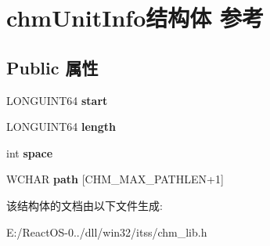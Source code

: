 \hypertarget{structchm_unit_info}{}\section{chm\+Unit\+Info结构体 参考}
\label{structchm_unit_info}
\subsection*{Public 属性}
\begin{DoxyCompactItemize}
\item 
\mbox{\label{structchm_unit_info_a5041f72b9341d7cce15dbae3bd778f76}} 
L\+O\+N\+G\+U\+I\+N\+T64 {\bfseries start}
\item 
\mbox{\label{structchm_unit_info_a7242e06a69b7251a0e4e9a118bc8ae0e}} 
L\+O\+N\+G\+U\+I\+N\+T64 {\bfseries length}
\item 
\mbox{\label{structchm_unit_info_ac9e01fa4af8a63cdeb5884c9d9b513a3}} 
int {\bfseries space}
\item 
\mbox{\label{structchm_unit_info_a48602f7f9cffe1c4d05a7b6ef32c7436}} 
W\+C\+H\+AR {\bfseries path} \mbox{[}C\+H\+M\+\_\+\+M\+A\+X\+\_\+\+P\+A\+T\+H\+L\+EN+1\mbox{]}
\end{DoxyCompactItemize}


该结构体的文档由以下文件生成\+:\begin{DoxyCompactItemize}
\item 
E\+:/\+React\+O\+S-\/0../dll/win32/itss/chm\+\_\+lib.\+h\end{DoxyCompactItemize}
